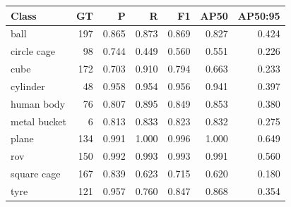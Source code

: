\begin{tabular}{lrrrrrr}
\toprule
Class & GT & P & R & F1 & AP50 & AP50:95 \\
\midrule
ball & 197 & 0.865 & 0.873 & 0.869 & 0.827 & 0.424 \\
circle cage & 98 & 0.744 & 0.449 & 0.560 & 0.551 & 0.226 \\
cube & 172 & 0.703 & 0.910 & 0.794 & 0.663 & 0.233 \\
cylinder & 48 & 0.958 & 0.954 & 0.956 & 0.941 & 0.397 \\
human body & 76 & 0.807 & 0.895 & 0.849 & 0.853 & 0.380 \\
metal bucket & 6 & 0.813 & 0.833 & 0.823 & 0.832 & 0.275 \\
plane & 134 & 0.991 & 1.000 & 0.996 & 1.000 & 0.649 \\
rov & 150 & 0.992 & 0.993 & 0.993 & 0.991 & 0.560 \\
square cage & 167 & 0.839 & 0.623 & 0.715 & 0.620 & 0.180 \\
tyre & 121 & 0.957 & 0.760 & 0.847 & 0.868 & 0.354 \\
\bottomrule
\end{tabular}
